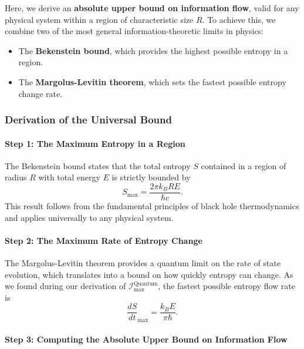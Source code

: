 \documentclass[12pt]{article}
\begin{document}
Here, we derive an \textbf{absolute upper bound on information flow}, valid for any physical system within a region of characteristic size \( R \). To achieve this, we combine two of the most general information-theoretic limits in physics:
\begin{itemize}
    \item The \textbf{Bekenstein bound}, which provides the highest possible entropy in a region.
    \item The \textbf{Margolus-Levitin theorem}, which sets the fastest possible entropy change rate.
\end{itemize}

\subsubsection{Derivation of the Universal Bound}

\paragraph{Step 1: The Maximum Entropy in a Region}

The Bekenstein bound states that the total entropy \( S \) contained in a region of radius \( R \) with total energy \( E \) is strictly bounded by
\begin{equation}
    S_{\max} = \frac{2\pi k_B R E}{\hbar c}.
\end{equation}
This result follows from the fundamental principles of black hole thermodynamics and applies universally to any physical system.

\paragraph{Step 2: The Maximum Rate of Entropy Change}

The Margolus-Levitin theorem provides a quantum limit on the rate of state evolution, which translates into a bound on how quickly entropy can change. As we found during our derivation of $\mathcal{I}_{\text{max}}^{\text{Quantum}}$, the fastest possible entropy flow rate is
\begin{equation}
    \frac{dS}{dt}_{\max} = \frac{k_B E}{\pi \hbar}.
\end{equation}

\paragraph{Step 3: Computing the Absolute Upper Bound on Information Flow}
\end{document}

